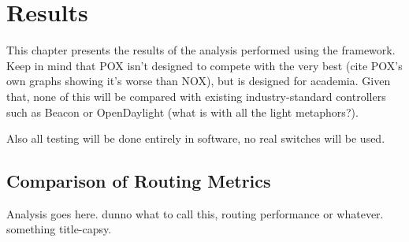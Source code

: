 \chapter{Results}

This chapter presents the results of the analysis performed using the framework. Keep in mind that POX isn't designed to compete with the very best (cite POX's own graphs showing it's worse than NOX), but is designed for academia. Given that, none of this will be compared with existing industry-standard controllers such as Beacon or OpenDaylight (what is with all the light metaphors?).

Also all testing will be done entirely in software, no real switches will be used.

\section{Comparison of Routing Metrics}
Analysis goes here. dunno what to call this, routing performance or whatever. something title-capsy.


